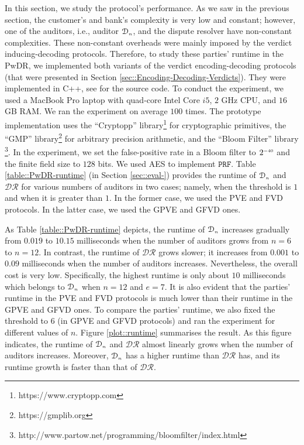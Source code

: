 In this section, we study the protocol's performance.   As we saw in the previous section, the customer's and bank's complexity is very low and constant; however, one of the auditors, i.e., auditor $\mathcal{D}_{\scriptscriptstyle n}$, and the dispute resolver have non-constant complexities.  These non-constant overheads were mainly imposed by the verdict inducing-decoding protocols. Therefore, to study these parties' runtime in the PwDR, we implemented both variants of the verdict encoding-decoding protocols (that were presented in Section  \ref{sec::Encoding-Decoding-Verdicts}). They  were implemented in C++, see  \cite{variant-1,variant-2}  for the source code. To conduct the experiment, we used a MacBook Pro laptop with quad-core Intel Core $i5$, $2$ GHz CPU, and $16$ GB RAM. We ran the experiment on average $100$ times. The prototype implementation uses the ``Cryptopp'' library\footnote{https://www.cryptopp.com}  for cryptographic primitives, the ``GMP'' library\footnote{https://gmplib.org} for arbitrary precision arithmetic, and the ``Bloom Filter'' library \footnote{http://www.partow.net/programming/bloomfilter/index.html}. In the experiment, we set the false-positive rate in a Bloom filter to $2^{\scriptscriptstyle -40}$ and the finite field size to $128$ bits. We used AES to implement $\mathtt{PRF}$. Table \ref{table::PwDR-runtime} (in Section \ref{sec::eval-}) provides the runtime of   $\mathcal{D}_{\scriptscriptstyle n}$ and $\mathcal{DR}$ for various numbers of auditors in two cases; namely, when the threshold is $1$ and when it is greater than $1$. In the former case, we used the PVE and FVD protocols.  In the latter case, we used the GPVE and GFVD ones. 



%


As  Table \ref{table::PwDR-runtime} depicts, the runtime of $\mathcal{D}_{\scriptscriptstyle n}$    increases gradually from $0.019$ to $10.15$ milliseconds when the number of auditors grows from $n=6$ to $n=12$.  In contrast, the runtime of $\mathcal{DR}$ grows slower; it increases from  $0.001$ to $0.09$ milliseconds when the number of auditors increases. Nevertheless, the overall cost is very low. Specifically, the highest runtime is only about $10$ milliseconds which belongs to $\mathcal{D}_{\scriptscriptstyle n}$ when $n=12$ and $e=7$. It is also evident that the parties' runtime in the PVE and FVD protocols is much lower than their runtime in the GPVE and GFVD ones. To compare the parties' runtime, we also fixed the threshold to $6$ (in GPVE and GFVD protocols) and ran the experiment for different values of $n$. Figure  \ref{plot::runtime} summarises the result. As this figure indicates, the runtime of  $\mathcal{D}_{\scriptscriptstyle n}$ and $\mathcal{DR}$ almost linearly grows when the number of auditors increases. Moreover,   $\mathcal{D}_{\scriptscriptstyle n}$  has a higher runtime than $\mathcal{DR}$ has,   and its runtime growth is faster than that of $\mathcal{DR}$. 
%
\vspace{-2.5mm}

